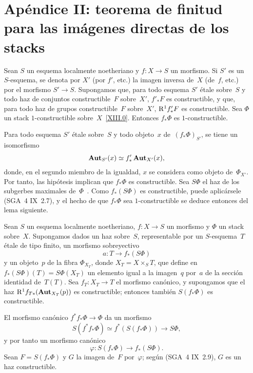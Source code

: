 
\section[Apéndice II: finitud para las imágenes directas de los stacks]
{Apéndice II: teorema de finitud para las imágenes directas de los stacks}
\label{XIII.6}

\begin{proposition}
\label{XIII.6.1}
Sean $S$ un esquema localmente noetheriano y $f\colon X\to S$ un
morfismo. Si $S'$ es un $S$-esquema, se denota por $X'$ (\resp por
$f'$, etc.) la imagen inversa de~$X$ (\resp de~$f$, etc.) por el
morfismo $S'\to S$. Supongamos que, para todo
esquema $S'$ étale sobre~$S$ y todo haz de conjuntos constructible~$F$
sobre~$X'$, $f'_*F$ es constructible, y que, para todo haz de grupos
constructible~$F$ sobre~$X'$, $\mathrm{R}^1f'_*F$ es constructible. Sea $\Phi$
un stack $1$-constructible sobre~$X$~\eqref{XIII.0}. Entonces $f_*\Phi$
es $1$-constructible.
\end{proposition}

Para todo esquema $S'$ étale sobre~$S$ y todo objeto~$x$
de~$(f_*\Phi)_{S'}$, se tiene un isomorfismo
$$
\operatorname{\mathbf{Aut}}_{S'}(x)\simeq f'_*\operatorname{\mathbf{Aut}}_{X'}(x),
$$
donde, en el segundo miembro de la igualdad, $x$ se considera como
objeto de~$\Phi_{X'}$. Por tanto, las hipótesis implican que $f_*\Phi$
es constructible. Sea $S\Phi$ el haz de los subgerbes maximales
de~$\Phi$~\cite[III~2.1.7]{XIII.1}. Como $f_*(S\Phi)$ es constructible,
puede aplicársele (SGA~4 IX~2.7), y el hecho de que $f_*\Phi$ sea
$1$-constructible se deduce entonces del lema siguiente.

\setcounter{subsection}{1}
\setcounter{subsubsection}{0}
\begin{sublemme}
\label{XIII.6.1.1}
Sean $S$ un esquema localmente noetheriano, $f\colon X\to S$ un
morfismo y $\Phi$ un stack sobre~$X$. Supongamos dados un haz sobre~$S$,
representable por un $S$-esquema~$T$ étale de tipo finito, un morfismo
sobreyectivo
$$
a\colon T\to f_*(S\Phi)
$$
y un objeto~$p$ de la fibra $\Phi_{X_T}$, donde
$X_T=X\times_ST$, que define en
$f_*(S\Phi)(T)=\allowbreak S\Phi(X_T)$ un elemento igual a la imagen~$q$
por~$a$ de la sección identidad de~$T(T)$. Sea
$f_T\colon X_T\to T$ el morfismo canónico, y supongamos que el haz
$\mathrm{R}^1f_{T*}(\operatorname{\mathbf{Aut}}_{X_T}(p))$ es constructible; entonces también
$S(f_*\Phi)$ es constructible.
\end{sublemme}

El morfismo canónico $f^*f_*\Phi\to\Phi$ da un morfismo
$$
S(f^*f_*\Phi)\simeq f^*(S(f_*\Phi))\to S\Phi,
$$
y por tanto un morfismo canónico
$$
\varphi\colon S(f_*\Phi)\to f_*(S\Phi).
$$
Sean
$F=S(f_*\Phi)$ y $G$ la imagen de~$F$ por~$\varphi$; según
(SGA~4 IX~2.9), $G$ es un haz constructible.

